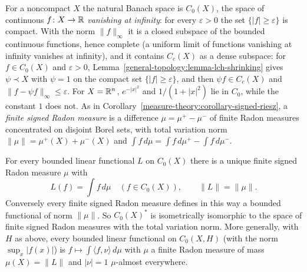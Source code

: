 For a noncompact $X$ the natural Banach space is $C_0(X)$, the space of continuous $f \colon X \to \mathbb{R}$ \emph{vanishing at infinity}: for every $\varepsilon > 0$ the set $\{|f| \geq \varepsilon\}$ is compact.
With the norm $\|f\|_\infty$ it is a closed subspace of the bounded continuous functions, hence complete (a uniform limit of functions vanishing at infinity vanishes at infinity), and it contains
$C_c(X)$ as a dense subspace: for $f \in C_0(X)$ and $\varepsilon > 0$, Lemma~\ref{general-topology:lemma-lch-shrinking} gives $\psi \prec X$ with $\psi = 1$ on the compact set $\{|f| \geq \varepsilon\}$, and
then $\psi f \in C_c(X)$ and $\|f - \psi f\|_\infty \leq \varepsilon$. For $X = \mathbb{R}^n$, $e^{-|x|^2}$ and $1/(1 + |x|^2)$ lie in $C_0$, while the constant $1$ does not. As in Corollary~\ref{measure-theory:corollary-signed-riesz}, a
\emph{finite signed Radon measure} is a difference $\mu = \mu^+ - \mu^-$ of finite Radon measures concentrated on disjoint Borel sets, with total variation norm $\|\mu\| = \mu^+(X) + \mu^-(X)$ and
$\int f\,d\mu = \int f\,d\mu^+ - \int f\,d\mu^-$.

\begin{corollary}\label{measure-theory:corollary-riesz-c0}
For every bounded linear functional $L$ on $C_0(X)$ there is a unique finite signed Radon measure $\mu$ with
\[
L(f) = \int f\,d\mu \quad (f \in C_0(X)), \qquad \|L\| = \|\mu\|.
\]
Conversely every finite signed Radon measure defines in this way a bounded functional of norm $\|\mu\|$. So $C_0(X)^*$ is isometrically isomorphic to the space of finite signed Radon measures with the
total variation norm. More generally, with $H$ as above, every bounded linear functional on $C_0(X, H)$ (with the norm $\sup_x|f(x)|$) is $f \mapsto \int\langle f, \nu\rangle\,d\mu$ with $\mu$ a finite Radon
measure of mass $\mu(X) = \|L\|$ and $|\nu| = 1$ $\mu$-almost everywhere.
\end{corollary}

